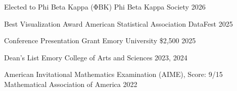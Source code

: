 
\begin{cvhonors}

\cvhonor
{Elected to Phi Beta Kappa (ΦΒΚ)} %
{Phi Beta Kappa Society} %
{} %
{2026} %

\cvhonor
{Best Visualization Award} %
{American Statistical Association DataFest} %
{} %
{2025} %

\cvhonor
{Conference Presentation Grant} %
{Emory University} %
{\$2,500} %
{2025} %

\cvhonor
{Dean's List} %
{Emory College of Arts and Sciences} %
{} %
{2023, 2024} %

\cvhonor
{American Invitational Mathematics Examination (AIME), Score: 9/15} %
{Mathematical Association of America} %
{} %
{2022} %

\end{cvhonors}